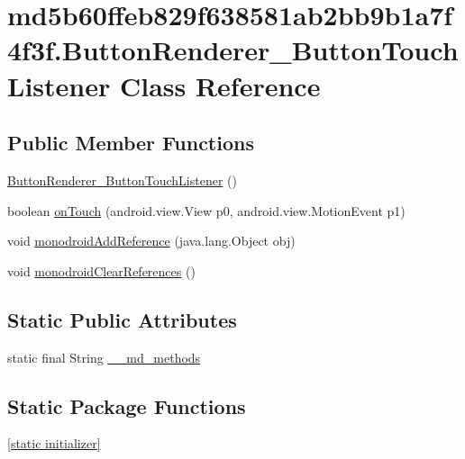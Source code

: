 \hypertarget{classmd5b60ffeb829f638581ab2bb9b1a7f4f3f_1_1_button_renderer___button_touch_listener}{
\section{md5b60ffeb829f638581ab2bb9b1a7f4f3f.ButtonRenderer\_\-ButtonTouchListener Class Reference}
\label{classmd5b60ffeb829f638581ab2bb9b1a7f4f3f_1_1_button_renderer___button_touch_listener}
}
\subsection*{Public Member Functions}
\begin{CompactItemize}
\item 
\hyperlink{classmd5b60ffeb829f638581ab2bb9b1a7f4f3f_1_1_button_renderer___button_touch_listener_192a213a65256d8407ba9184a509de91}{ButtonRenderer\_\-ButtonTouchListener} ()
\item 
boolean \hyperlink{classmd5b60ffeb829f638581ab2bb9b1a7f4f3f_1_1_button_renderer___button_touch_listener_3fce128bd937b47b24703f5215265222}{onTouch} (android.view.View p0, android.view.MotionEvent p1)
\item 
void \hyperlink{classmd5b60ffeb829f638581ab2bb9b1a7f4f3f_1_1_button_renderer___button_touch_listener_4df5f08247cc553253fcc43ebaf00637}{monodroidAddReference} (java.lang.Object obj)
\item 
void \hyperlink{classmd5b60ffeb829f638581ab2bb9b1a7f4f3f_1_1_button_renderer___button_touch_listener_91150dd8f1d697f0ed9ee864c201bc56}{monodroidClearReferences} ()
\end{CompactItemize}
\subsection*{Static Public Attributes}
\begin{CompactItemize}
\item 
static final String \hyperlink{classmd5b60ffeb829f638581ab2bb9b1a7f4f3f_1_1_button_renderer___button_touch_listener_fd5f3e04e3609dcb075193a11013bec6}{\_\-\_\-md\_\-methods}
\end{CompactItemize}
\subsection*{Static Package Functions}
\begin{CompactItemize}
\item 
\hyperlink{classmd5b60ffeb829f638581ab2bb9b1a7f4f3f_1_1_button_renderer___button_touch_listener_1c2ba94cf28bcec16dfbb1984629d37a}{\mbox{[}static initializer\mbox{]}}
\end{CompactItemize}
